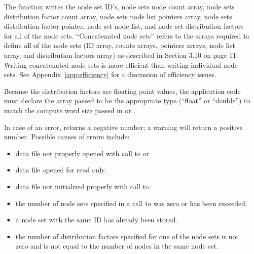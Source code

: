 The function  writes the node set
ID's, node sets node count array, node sets distribution factor count
array, node sets node list pointers array, node sets distribution
factor pointer, node set node list, and node set distribution factors
for all of the node sets. ``Concatenated node sets'' refers to the
arrays required to define all of the node sets (ID array, counts
arrays, pointers arrays, node list array, and distribution factors
array) as described in Section 3.10 on page 11. Writing concatenated
node sets is more efficient than writing individual node sets. See
Appendix~\ref{app:efficiency} for a discussion of efficiency issues.


Because the distribution factors are floating point values, the
application code must declare the array passed to be the appropriate
type (``float'' or ``double'') to match the compute word size passed
in  or .


In case of an error,  returns
a negative number; a warning will return a positive number.
Possible causes of errors include:

\begin{itemize}
 \item data file not properly opened with call to 
or 

 \item data file opened for read only.

 \item data file not initialized properly with call to .

 \item the number of node sets specified in a call to
  was zero or has been exceeded.

 \item a node set with the same ID has already been stored.

 \item the number of distribution factors specified for one of the
 node sets is not zero and is not equal to the number of nodes in the
 same node set.
\end{itemize}



